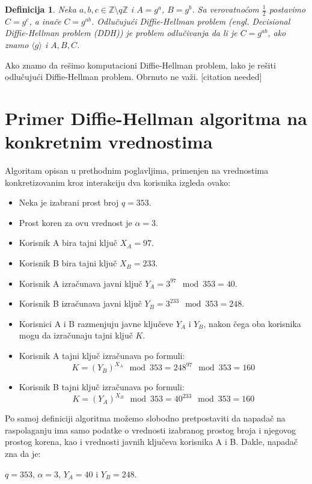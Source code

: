 \documentclass[a4paper]{article}
\newtheorem{defn}[primer]{Definicija}
\begin{document}
{\begin{defn}
    Neka $a,b,c\in \mathbb{Z}\setminus q\mathbb{Z}$ i $A = g^a$, $B = g^b$. Sa verovatnoćom $\frac{1}{2}$ postavimo $C = g^c$, 
    a inače $C = g^{ab}$. Odlučujući Diffie-Hellman problem (engl. \emph{Decisional Diffie-Hellman problem (DDH)}) je problem
    odlučivanja da li je $C = g^{ab}$, ako znamo $\langle g \rangle$ i $A, B, C$.
\end{defn}

Ako znamo da rešimo komputacioni Diffie-Hellman problem, lako je rešiti odlučujući Diffie-Hellman problem.
Obrnuto ne važi. [citation needed]

\section{Primer Diffie-Hellman algoritma na konkretnim vrednostima}
\label{sec:primerDH}

Algoritam opisan u prethodnim poglavljima, primenjen na vrednostima konkretizovanim kroz interakciju dva korisnika izgleda ovako:
\begin{itemize}
  \item Neka je izabrani prost broj $q=353$.
  \item Prost koren za ovu vrednost je $\alpha=3$. 
  \item Korisnik A bira tajni ključ $X_A=97$. \item Korisnik B bira tajni ključ $X_B=233$.
  \item Korisnik A izračunava javni ključ $Y_A=3^{97}\mod353=40$.
  \item Korisnik B izračunava javni ključ $Y_B=3^{233}\mod353=248$.
  \item Korisnici A i B razmenjuju javne ključeve $Y_A$ i $Y_B$, nakon čega oba korisnika mogu da izračunaju tajni ključ $K$.
  \item Korisnik A tajni ključ izračunava po formuli: $$K=(Y_B)^{X_A}\mod353=248^{97}\mod353=160$$
  \item Korisnik B tajni ključ izračunava po formuli: $$K=(Y_A)^{X_B}\mod353=40^{233}\mod353=160$$
\end{itemize}

Po samoj definiciji algoritma možemo slobodno pretpostaviti da napadač na raspolaganju ima samo podatke o vrednosti izabranog prostog broja i njegovog prostog korena, kao i vrednosti javnih ključeva korisnika A i B. Dakle, napadač zna da je: \\\centerline{$q=353$, $\alpha=3$, $Y_A=40$ i $Y_B=248$.}

}
\end{document}
